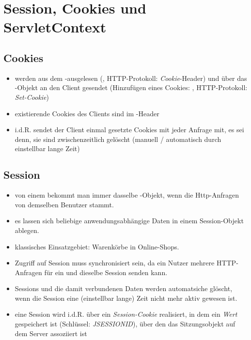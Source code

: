 \section{Session, Cookies und ServletContext}

\subsection{Cookies}

\begin{itemize}
    \item werden aus dem -ausgelesen (, HTTP-Protokoll: \textit{Cookie}-Header) und über das -Objekt an den Client gesendet (Hinzufügen eines Cookies: , HTTP-Protokoll: \textit{Set-Cookie})
    \item existierende Cookies des Clients sind im -Header
    \item i.d.R. sendet der Client einmal gesetzte Cookies mit jeder Anfrage mit, es sei denn, sie sind zwischenzeitlich gelöscht (manuell / automatisch durch einstellbar lange Zeit)
\end{itemize}


\subsection{Session}
\begin{itemize}
    \item von einem  bekommt man immer dasselbe -Objekt, wenn die Http-Anfragen von demselben Benutzer stammt.
    \item es lassen sich beliebige anwendungsabhängige Daten in einem Session-Objekt ablegen.
    \item klassisches Einsatzgebiet: Warenkörbe in Online-Shops.
    \item Zugriff auf Session muss synchronisiert sein, da ein Nutzer mehrere HTTP-Anfragen für ein und dieselbe Session senden kann.
    \item Sessions und die damit verbundenen Daten werden automatsiche glöscht, wenn die Session eine (einstellbar lange) Zeit nicht mehr aktiv gewesen ist.
    \item eine Session wird i.d.R. über ein \textit{Session-Cookie} realisiert, in dem ein \textit{Wert} gespeichert ist (Schlüssel: \textit{JSESSIONID}), über den das Sitzungsobjekt auf dem Server assoziiert ist
\end{itemize}


